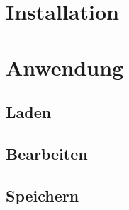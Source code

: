 \documentclass{scrbook}
\begin{document}
	\section{Installation}
	
	\section{Anwendung}
		\subsection{Laden}
		
		\subsection{Bearbeiten}
		
		\subsection{Speichern}
\end{document}
